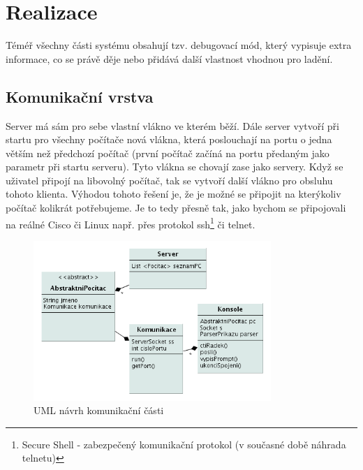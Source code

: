 \chapter{Realizace} \label{realizace}


Téméř všechny části systému obsahují tzv. debugovací mód, který vypisuje extra informace, co se právě děje nebo přidává další vlastnost vhodnou pro ladění.

\section{Komunikační vrstva}
Server má sám pro sebe vlastní vlákno ve kterém běží. Dále server vytvoří při startu pro všechny počítače nová vlákna, která poslouchají na portu o jedna větším než předchozí počítač (první počítač začíná na portu předaným jako parametr při startu serveru). Tyto vlákna se chovají zase jako servery. Když se uživatel připojí na libovolný počítač, tak se vytvoří další vlákno pro obsluhu tohoto klienta. Výhodou tohoto řešení je, že je možné se připojit na kterýkoliv počítač kolikrát potřebujeme. Je to tedy přesně tak, jako bychom se připojovali na reálné Cisco či Linux např. přes protokol ssh\footnote{Secure Shell - zabezpečený komunikační protokol (v současné době náhrada telnetu)} či telnet.

\begin{figure}[h]
\begin{center}
\includegraphics[width=9cm]{figures/uml_sit}
\caption{UML návrh komunikační části}
\label{uml:sit}
\end{center}
\end{figure}

